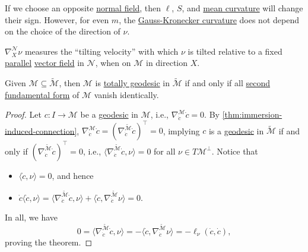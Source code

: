 \begin{note}
	If we choose an opposite \hyperref[not:normal-bundle]{normal field}, then \(\ell \), \(S\), and \hyperref[def:mean-curvature]{mean curvature} will change their sign. However, for even \(m\), the \hyperref[def:Gauss-Kronecker-curvature]{Gauss-Kronecker curvature} does not depend on the choice of the direction of \(\nu \).
\end{note}

\begin{intuition}
	\(\nabla _X^{\mathcal{N} } \nu \) measures the ``tilting velocity'' with which \(\nu \) is tilted relative to a fixed \hyperref[def:parallel]{parallel} \hyperref[def:vector-field]{vector field} in \(\mathcal{N} \), when on \(\mathcal{M} \) in direction \(X\).
\end{intuition}

\begin{theorem}\label{thm:totally-geodesic-second-fundamental-form}
	Given \(\mathcal{M} \subseteq \widetilde{\mathcal{M}} \), then \(\mathcal{M} \) is \hyperref[def:totally-geodesic]{totally geodesic} in \(\widetilde{\mathcal{M}} \) if and only if all \hyperref[def:2nd-fundamental-form]{second fundamental form} of \(\mathcal{M} \) vanish identically.
\end{theorem}
\begin{proof}
	Let \(c\colon I \to \mathcal{M} \) be a \hyperref[def:geodesic]{geodesic} in \(\mathcal{M} \), i.e., \(\nabla _{\dot{c} }^{\mathcal{M}} \dot{c} = 0\). By \autoref{thm:immersion-induced-connection}, \(\nabla _{\dot{c} }^{\mathcal{M}} \dot{c} = (\nabla _{\dot{c} }^{\widetilde{\mathcal{M}} } \dot{c} )^{\top} = 0\), implying \(c\) is a \hyperref[def:geodesic]{geodesic} in \(\widetilde{\mathcal{M}} \) if and only if \((\nabla _{\dot{c} }^{\widetilde{\mathcal{M}} } \dot{c} )^{\top} = 0\), i.e., \(\langle \nabla _{\dot{c} }^{\widetilde{\mathcal{M}} } \dot{c} , \nu \rangle = 0\) for all \(\nu \in T \mathcal{M} ^{\perp} \). Notice that
	\begin{itemize}
		\item \(\langle \dot{c} , \nu \rangle = 0\), and hence
		\item \(\dot{c} \langle \dot{c} , \nu \rangle = \langle \nabla _{\dot{c} }^{\widetilde{\mathcal{M}} } \dot{c} , \nu \rangle + \langle \dot{c} , \nabla _{\dot{c} }^{\widetilde{\mathcal{M}} } \nu \rangle = 0\).
	\end{itemize}
	In all, we have
	\[
		0 = \langle \nabla _{\dot{c}}^{\widetilde{\mathcal{M}} } \dot{c} , \nu \rangle
		= -\langle \dot{c} , \nabla _{\dot{c} }^{\widetilde{\mathcal{M}} } \nu \rangle
		= -\ell _{\nu } (\dot{c}, \dot{c} ),
	\]
	proving the theorem.
\end{proof}

